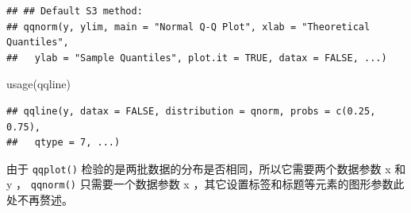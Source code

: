 \documentclass[
  b5paper,
  UTF8,twoside]{book}
\newenvironment{Shaded}{\begin{snugshade}}{\end{snugshade}}
\newcommand{\AttributeTok}[1]{\textcolor[rgb]{0.77,0.63,0.00}{#1}}
\newcommand{\ConstantTok}[1]{\textcolor[rgb]{0.00,0.00,0.00}{#1}}
\newcommand{\DecValTok}[1]{\textcolor[rgb]{0.00,0.00,0.81}{#1}}
\newcommand{\FloatTok}[1]{\textcolor[rgb]{0.00,0.00,0.81}{#1}}
\newcommand{\FunctionTok}[1]{\textcolor[rgb]{0.00,0.00,0.00}{#1}}
\newcommand{\NormalTok}[1]{#1}
\newcommand{\OtherTok}[1]{\textcolor[rgb]{0.56,0.35,0.01}{#1}}
\newcommand{\SpecialCharTok}[1]{\textcolor[rgb]{0.00,0.00,0.00}{#1}}
\newcommand{\StringTok}[1]{\textcolor[rgb]{0.31,0.60,0.02}{#1}}
\begin{document}
\begin{verbatim}
## ## Default S3 method:
## qqnorm(y, ylim, main = "Normal Q-Q Plot", xlab = "Theoretical Quantiles",
##   ylab = "Sample Quantiles", plot.it = TRUE, datax = FALSE, ...)
\end{verbatim}

\begin{Shaded}
\begin{Highlighting}[]
\FunctionTok{usage}\NormalTok{(qqline)}
\end{Highlighting}
\end{Shaded}

\begin{verbatim}
## qqline(y, datax = FALSE, distribution = qnorm, probs = c(0.25, 0.75),
##   qtype = 7, ...)
\end{verbatim}

由于 \texttt{qqplot()} 检验的是两批数据的分布是否相同，所以它需要两个数据参数 x 和 y ， \texttt{qqnorm()} 只需要一个数据参数 x ，其它设置标签和标题等元素的图形参数此处不再赘述。





\begin{Shaded}
\end{Shaded}
\end{document}
